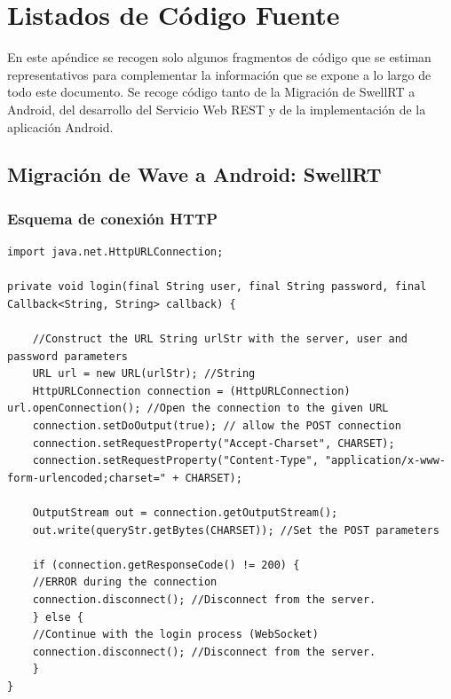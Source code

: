 

\chapter{Listados de Código Fuente}

En este apéndice se recogen solo algunos fragmentos de código que se estiman representativos para complementar la información que se expone a lo largo de todo este documento. Se recoge código tanto de la Migración de SwellRT a Android, del desarrollo del Servicio Web REST y de la implementación de la aplicación Android.

\section{Migración de Wave a Android: SwellRT}

\subsection{Esquema de conexión HTTP}\label{ssec:codeHTTP}

	  \begin{lstlisting}[frame=single]	  
import java.net.HttpURLConnection;

private void login(final String user, final String password, final Callback<String, String> callback) {
  
    //Construct the URL String urlStr with the server, user and password parameters
    URL url = new URL(urlStr); //String 
    HttpURLConnection connection = (HttpURLConnection) url.openConnection(); //Open the connection to the given URL 
    connection.setDoOutput(true); // allow the POST connection
    connection.setRequestProperty("Accept-Charset", CHARSET);
    connection.setRequestProperty("Content-Type", "application/x-www-form-urlencoded;charset=" + CHARSET);

    OutputStream out = connection.getOutputStream(); 
    out.write(queryStr.getBytes(CHARSET)); //Set the POST parameters

    if (connection.getResponseCode() != 200) {
	//ERROR during the connection
	connection.disconnect(); //Disconnect from the server.
    } else {
	//Continue with the login process (WebSocket)
	connection.disconnect(); //Disconnect from the server.
    }		      
}	    
	  \end{lstlisting}  
	  
